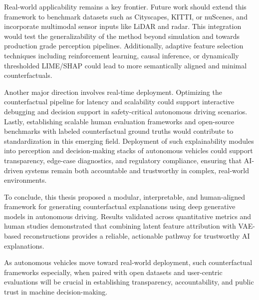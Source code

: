 Real-world applicability remains a key frontier. Future work should extend this framework to benchmark datasets such as Cityscapes, KITTI, or nuScenes, and incorporate multimodal sensor inputs like LiDAR and radar. This integration would test the generalizability of the method beyond simulation and towards production grade perception pipelines. Additionally, adaptive feature selection techniques including reinforcement learning, causal inference, or dynamically thresholded LIME/SHAP could lead to more semantically aligned and minimal counterfactuals.

Another major direction involves real-time deployment. Optimizing the counterfactual pipeline for latency and scalability could support interactive debugging and decision support in safety-critical autonomous driving scenarios. Lastly, establishing scalable human evaluation frameworks and open-source benchmarks with labeled counterfactual ground truths would contribute to standardization in this emerging field. Deployment of such explainability modules into perception and decision-making stacks of autonomous vehicles could support transparency, edge-case diagnostics, and regulatory compliance, ensuring that AI-driven systems remain both accountable and trustworthy in complex, real-world environments.



To conclude, this thesis proposed a modular, interpretable, and human-aligned framework for generating counterfactual explanations using deep generative models in autonomous driving. Results validated across quantitative metrics and human studies demonstrated that combining latent feature attribution with VAE-based reconstructions provides a reliable, actionable pathway for trustworthy AI explanations.

As autonomous vehicles move toward real-world deployment, such counterfactual frameworks especially, when paired with open datasets and user-centric evaluations will be crucial in establishing transparency, accountability, and public trust in machine decision-making.